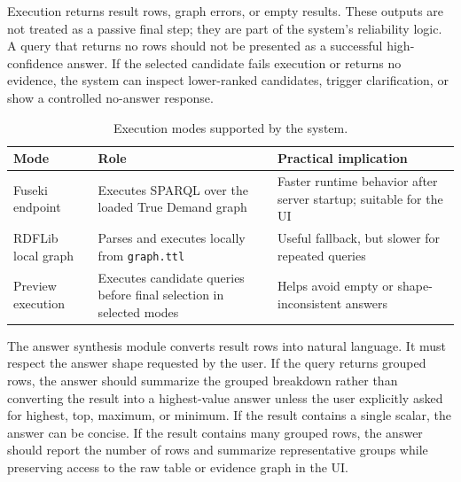 Execution returns result rows, graph errors, or empty results. These outputs are not treated as a passive final step; they are part of the system's reliability logic. A query that returns no rows should not be presented as a successful high-confidence answer. If the selected candidate fails execution or returns no evidence, the system can inspect lower-ranked candidates, trigger clarification, or show a controlled no-answer response.

\begin{table}[ht]
\centering
\caption{Execution modes supported by the system.}
\label{tab:execution-modes}
\begin{tabular}{p{3.2cm}p{5.2cm}p{5.2cm}}
\hline
\textbf{Mode} & \textbf{Role} & \textbf{Practical implication} \\
\hline
Fuseki endpoint & Executes SPARQL over the loaded True Demand graph & Faster runtime behavior after server startup; suitable for the UI \\
RDFLib local graph & Parses and executes locally from \texttt{graph.ttl} & Useful fallback, but slower for repeated queries \\
Preview execution & Executes candidate queries before final selection in selected modes & Helps avoid empty or shape-inconsistent answers \\
\hline
\end{tabular}
\end{table}

The answer synthesis module converts result rows into natural language. It must respect the answer shape requested by the user. If the query returns grouped rows, the answer should summarize the grouped breakdown rather than converting the result into a highest-value answer unless the user explicitly asked for highest, top, maximum, or minimum. If the result contains a single scalar, the answer can be concise. If the result contains many grouped rows, the answer should report the number of rows and summarize representative groups while preserving access to the raw table or evidence graph in the UI.

